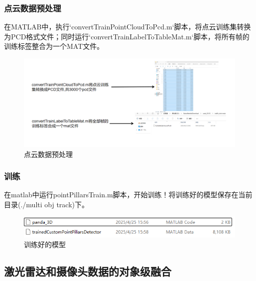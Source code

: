 \subsubsection{点云数据预处理}
在MATLAB中，执行`convertTrainPointCloudToPcd.m`脚本，将点云训练集转换为PCD格式文件；同时运行`convertTrainLabelToTableMat.m`脚本，将所有帧的训练标签整合为一个MAT文件。




\begin{figure}[htbp] %
	\centering
	\includegraphics[width=1\textwidth]{p10} %
	\caption{点云数据预处理} %
	\label{fig:p10} %
\end{figure}




\subsubsection{训练}
在matlab中运行pointPillarsTrain.m脚本，开始训练！将训练好的模型保存在当前目录(./multi obj track)下。




\begin{figure}[htbp] %
	\centering
	\includegraphics[width=1\textwidth]{p11} %
	\caption{训练好的模型} %
	\label{fig:p11} %
\end{figure}






\subsection{激光雷达和摄像头数据的对象级融合}

